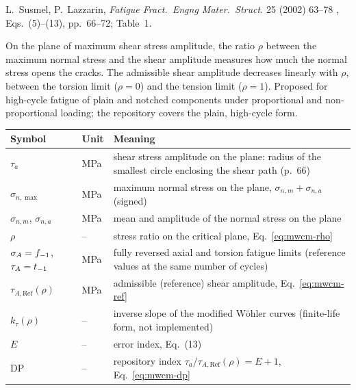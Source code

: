 \label{sheet:MWCM}

 L.~Susmel, P.~Lazzarin, \emph{Fatigue Fract.\ Engng Mater.\ Struct.} 25 (2002) 63--78
\cite{susmel2002}, Eqs.~(5)--(13), pp.~66--72; Table~1.

 On the plane of maximum shear stress amplitude, the ratio $\rho$ between the
maximum normal stress and the shear amplitude measures how much the normal stress opens the cracks.
The admissible shear amplitude decreases linearly with $\rho$, between the torsion limit ($\rho=0$)
and the tension limit ($\rho=1$). Proposed for high-cycle fatigue of plain and notched components
under proportional and non-proportional loading; the repository covers the plain, high-cycle form.

\begin{center}\small
\begin{tabular}{@{}llp{100mm}@{}}
\toprule
Symbol & Unit & Meaning\\\midrule
$\tau_a$ & MPa & shear stress amplitude on the plane: radius of the smallest circle enclosing the shear path (p.~66)\\
$\sigma_{n,\max}$ & MPa & maximum normal stress on the plane, $\sigma_{n,m}+\sigma_{n,a}$ (signed)\\
$\sigma_{n,m}$, $\sigma_{n,a}$ & MPa & mean and amplitude of the normal stress on the plane\\
$\rho$ & -- & stress ratio on the critical plane, Eq.~\eqref{eq:mwcm-rho}\\
$\sigma_A=f_{-1}$, $\tau_A=t_{-1}$ & MPa & fully reversed axial and torsion fatigue limits (reference values at the same number of cycles)\\
$\tau_{A,\mathrm{Ref}}(\rho)$ & MPa & admissible (reference) shear amplitude, Eq.~\eqref{eq:mwcm-ref}\\
$k_\tau(\rho)$ & -- & inverse slope of the modified W\"ohler curves (finite-life form, not implemented)\\
$E$ & -- & error index, Eq.~(13)\\
$\mathrm{DP}$ & -- & repository index $\tau_a/\tau_{A,\mathrm{Ref}}(\rho)=E+1$, Eq.~\eqref{eq:mwcm-dp}\\
\bottomrule
\end{tabular}
\end{center}

